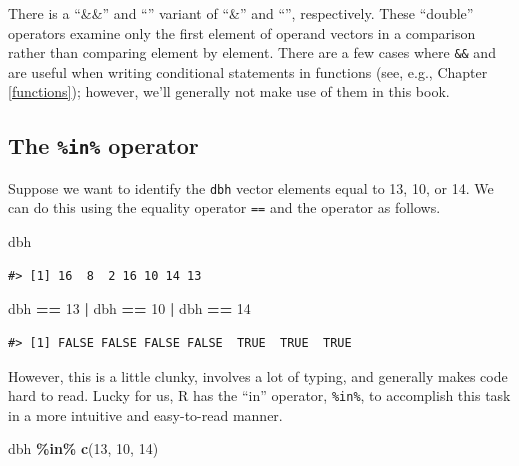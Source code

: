 \documentclass[
  11pt,
]{krantz}
\newenvironment{Shaded}{\begin{snugshade}}{\end{snugshade}}
\newcommand{\DecValTok}[1]{\textcolor[rgb]{0.00,0.00,0.81}{#1}}
\newcommand{\KeywordTok}[1]{\textcolor[rgb]{0.13,0.29,0.53}{\textbf{#1}}}
\newcommand{\NormalTok}[1]{#1}
\newcommand{\OperatorTok}[1]{\textcolor[rgb]{0.81,0.36,0.00}{\textbf{#1}}}
\newcommand{\StringTok}[1]{\textcolor[rgb]{0.31,0.60,0.02}{#1}}
\theoremstyle{definition}
\theoremstyle{definition}
\theoremstyle{definition}
\theoremstyle{definition}
\theoremstyle{remark}
\begin{document}
There is a ``\&\&'' and ``\textbar\textbar{}'' variant of ``\&'' and ``\textbar{}'', respectively. These ``double'' operators examine only the first element of operand vectors in a comparison rather than comparing element by element. There are a few cases where \texttt{\&\&} and \texttt{\textbar{}\textbar{}} are useful when writing conditional statements in functions (see, e.g., Chapter \ref{functions}); however, we'll generally not make use of them in this book.

\hypertarget{inOperator}{%
\subsection{\texorpdfstring{The \texttt{\%in\%} operator}{The \%in\% operator}}\label{inOperator}}

Suppose we want to identify the \texttt{dbh} vector elements equal to 13, 10, or 14. We can do this using the equality operator \texttt{==} and the \texttt{\textbar{}} operator as follows.

\begin{Shaded}
\begin{Highlighting}[]
\NormalTok{dbh}
\end{Highlighting}
\end{Shaded}

\begin{verbatim}
#> [1] 16  8  2 16 10 14 13
\end{verbatim}

\begin{Shaded}
\begin{Highlighting}[]
\NormalTok{dbh }\OperatorTok{==}\StringTok{ }\DecValTok{13} \OperatorTok{|}\StringTok{ }\NormalTok{dbh }\OperatorTok{==}\StringTok{ }\DecValTok{10} \OperatorTok{|}\StringTok{ }\NormalTok{dbh }\OperatorTok{==}\StringTok{ }\DecValTok{14}
\end{Highlighting}
\end{Shaded}

\begin{verbatim}
#> [1] FALSE FALSE FALSE FALSE  TRUE  TRUE  TRUE
\end{verbatim}

However, this is a little clunky, involves a lot of typing, and generally makes code hard to read. Lucky for us, R has the ``in'' operator, \texttt{\%in\%}, to accomplish this task in a more intuitive and easy-to-read manner.

\begin{Shaded}
\begin{Highlighting}[]
\NormalTok{dbh }\OperatorTok{\%in\%}\StringTok{ }\KeywordTok{c}\NormalTok{(}\DecValTok{13}\NormalTok{, }\DecValTok{10}\NormalTok{, }\DecValTok{14}\NormalTok{)}
\end{Highlighting}
\end{Shaded}
\end{document}
